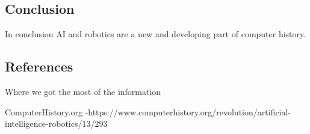 \documentclass[11pt, twocolumn]{article}
\begin{document}
\subsection{Conclusion}
In conclusion AI and robotics are a new and developing part of computer history. 




\subsection{References}
Where we got the most of the information

ComputerHistory.org 
-https://www.computerhistory.org/revolution/artificial-intelligence-robotics/13/293
\end{document}
